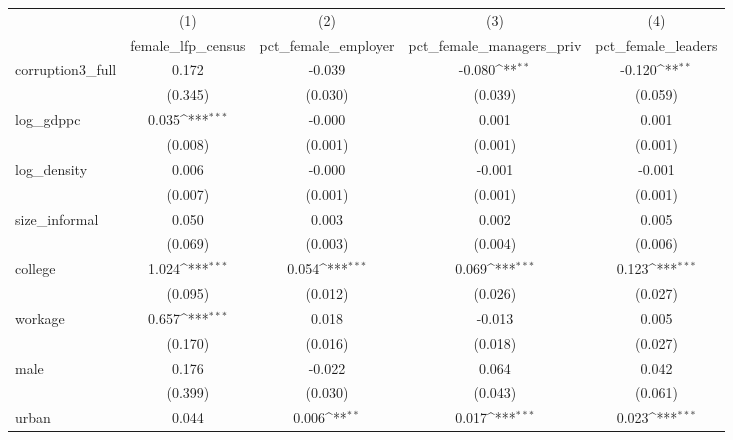 {
\def\sym#1{\ifmmode^{#1}\else\(^{#1}\)\fi}
\begin{tabular}{l*{4}{c}}
\hline\hline
            &\multicolumn{1}{c}{(1)}&\multicolumn{1}{c}{(2)}&\multicolumn{1}{c}{(3)}&\multicolumn{1}{c}{(4)}\\
            &\multicolumn{1}{c}{female\_lfp\_census}&\multicolumn{1}{c}{pct\_female\_employer}&\multicolumn{1}{c}{pct\_female\_managers\_priv}&\multicolumn{1}{c}{pct\_female\_leaders}\\
\hline
corruption3\_full&       0.172         &      -0.039         &      -0.080\sym{**} &      -0.120\sym{**} \\
            &     (0.345)         &     (0.030)         &     (0.039)         &     (0.059)         \\
[1em]
log\_gdppc   &       0.035\sym{***}&      -0.000         &       0.001         &       0.001         \\
            &     (0.008)         &     (0.001)         &     (0.001)         &     (0.001)         \\
[1em]
log\_density &       0.006         &      -0.000         &      -0.001         &      -0.001         \\
            &     (0.007)         &     (0.001)         &     (0.001)         &     (0.001)         \\
[1em]
size\_informal&       0.050         &       0.003         &       0.002         &       0.005         \\
            &     (0.069)         &     (0.003)         &     (0.004)         &     (0.006)         \\
[1em]
college     &       1.024\sym{***}&       0.054\sym{***}&       0.069\sym{***}&       0.123\sym{***}\\
            &     (0.095)         &     (0.012)         &     (0.026)         &     (0.027)         \\
[1em]
workage     &       0.657\sym{***}&       0.018         &      -0.013         &       0.005         \\
            &     (0.170)         &     (0.016)         &     (0.018)         &     (0.027)         \\
[1em]
male        &       0.176         &      -0.022         &       0.064         &       0.042         \\
            &     (0.399)         &     (0.030)         &     (0.043)         &     (0.061)         \\
[1em]
urban       &       0.044         &       0.006\sym{**} &       0.017\sym{***}&       0.023\sym{***}\\

\end{tabular}}
